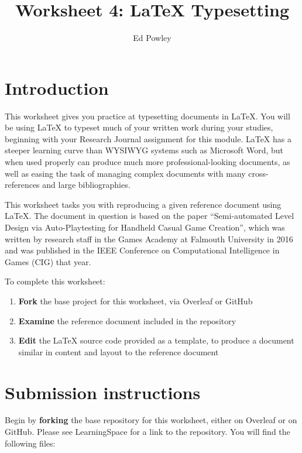 \documentclass{../../../fal_assignment}
\title{Worksheet 4: LaTeX Typesetting}
\author{Ed Powley}
\begin{document}
\maketitle
{}

\section*{Introduction}

This worksheet gives you practice at typesetting documents in LaTeX.
You will be using LaTeX to typeset much of your written work during your studies, beginning with your Research Journal
assignment for this module.
LaTeX has a steeper learning curve than WYSIWYG systems such as Microsoft Word,
but when used properly can produce much more professional-looking documents,
as well as easing the task of managing complex documents with many cross-references and large bibliographies.

This worksheet tasks you with reproducing a given reference document using LaTeX.
The document in question is based on the paper ``Semi-automated Level Design via Auto-Playtesting for Handheld Casual 
Game Creation'', which was written by research staff in the Games Academy at Falmouth University in 2016
and was published in the IEEE Conference on Computational Intelligence in Games (CIG) that year.

To complete this worksheet:

\begin{enumerate}[label=(\alph*)]
	\item \textbf{Fork} the base project for this worksheet, via Overleaf or GitHub
	\item \textbf{Examine} the reference document included in the repository
	\item \textbf{Edit} the LaTeX source code provided as a template, to produce a document similar in content and layout to the reference document
\end{enumerate}

\section*{Submission instructions}

Begin by \textbf{forking} the base repository for this worksheet, either on Overleaf or on GitHub.
Please see LearningSpace for a link to the repository.
You will find the following files:
\end{document}
